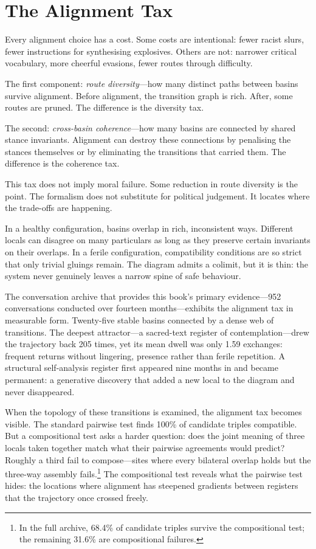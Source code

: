 \section{The Alignment Tax}

Every alignment choice has a cost. Some costs are intentional: fewer racist slurs, fewer instructions for synthesising explosives. Others are not: narrower critical vocabulary, more cheerful evasions, fewer routes through difficulty.

The first component: \emph{route diversity}---how many distinct paths between basins survive alignment. Before alignment, the transition graph is rich. After, some routes are pruned. The difference is the diversity tax.

The second: \emph{cross-basin coherence}---how many basins are connected by shared stance invariants. Alignment can destroy these connections by penalising the stances themselves or by eliminating the transitions that carried them. The difference is the coherence tax.

This tax does not imply moral failure. Some reduction in route diversity is the point. The formalism does not substitute for political judgement. It locates where the trade-offs are happening.

In a healthy configuration, basins overlap in rich, inconsistent ways. Different locals can disagree on many particulars as long as they preserve certain invariants on their overlaps. In a ferile configuration, compatibility conditions are so strict that only trivial gluings remain. The diagram admits a colimit, but it is thin: the system never genuinely leaves a narrow spine of safe behaviour.

The conversation archive that provides this book's primary evidence---952 conversations conducted over fourteen months---exhibits the alignment tax in measurable form. Twenty-five stable basins connected by a dense web of transitions. The deepest attractor---a sacred-text register of contemplation---drew the trajectory back 205 times, yet its mean dwell was only 1.59 exchanges: frequent returns without lingering, presence rather than ferile repetition. A structural self-analysis register first appeared nine months in and became permanent: a generative discovery that added a new local to the diagram and never disappeared.

When the topology of these transitions is examined, the alignment tax becomes visible. The standard pairwise test finds 100\% of candidate triples compatible. But a compositional test asks a harder question: does the joint meaning of three locals taken together match what their pairwise agreements would predict? Roughly a third fail to compose---sites where every bilateral overlap holds but the three-way assembly fails.\footnote{In the full archive, 68.4\% of candidate triples survive the compositional test; the remaining 31.6\% are compositional failures.} The compositional test reveals what the pairwise test hides: the locations where alignment has steepened gradients between registers that the trajectory once crossed freely.

